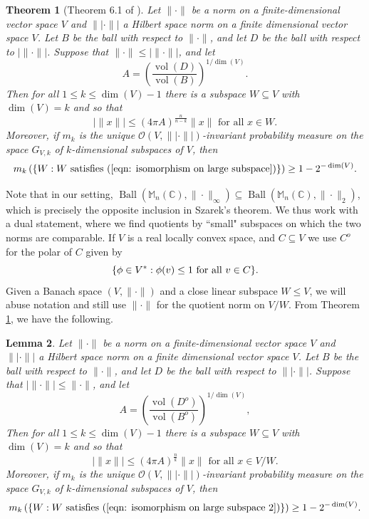 \documentclass[10pt]{amsart}
\newtheorem{thm}{Theorem}[section]
\newtheorem{lem}[thm]{Lemma}
\theoremstyle{definition}
\numberwithin{equation}{section}
\newcommand{\bC}{{\mathbb C}}
\newcommand{\bM}{{\mathbb M}}
\DeclareMathOperator{\vol}{vol}
\DeclareMathOperator{\Ball}{Ball}
\begin{document}
\begin{thm}[Theorem 6.1 of \cite{Pis}]\label{lemm: isomorphism on large subspace}
Let $\|\cdot\|$ be a norm on a finite-dimensional vector space $V$ and $\||\cdot\||$ a Hilbert space norm on a finite dimensional vector space $V$. Let $B$ be the  ball with respect to $\|\cdot\|$, and let $D$ be the ball with respect to $|\|\cdot\||$. Suppose that $ \|\cdot\|\leq |\|\cdot\||$, and let 
\[A=\left(\frac{\vol(D)}{\vol(B)}\right)^{1/\dim(V)}.\]
Then for all $1\leq k\leq \dim(V)-1$ there is a subspace $W\subseteq V$ with $\dim(V)=k$ and so that 
\begin{equation}\label{eqn: isomorphism on large subspace}
|\|x\||\leq \left(4\pi A\right)^{\frac{n}{n-k}}\|x\|\mbox{ for all $x\in W$.}
\end{equation}
Moreover, if $m_{k}$ is the unique $\mathcal{O}(V,\||\cdot\||)$-invariant probability measure on the space $G_{V,k}$ of $k$-dimensional subspaces of $V$, then
\[m_{k}\left(\{W:W \textnormal{ satisfies (\ref{eqn: isomorphism on large subspace})}\}\right)\geq 1-2^{-\dim(V)}.\]
\end{thm}


Note that in our setting, $\Ball(\bM_{n}(\bC),\|\cdot\|_{\infty})\subseteq \Ball(\bM_{n}(\bC),\|\cdot\|_{2})$, which is precisely the opposite inclusion in Szarek's theorem. We thus work with a dual statement, where we find quotients by ``small" subspaces on which the two norms are comparable. 
If $V$ is a real locally convex space, and $C\subseteq V$ we use $C^{o}$ for the polar of $C$ given by
\[\{\phi\in V^{*}:\phi(v)\leq 1\textnormal{ for all $v\in C$}\}.\]
Given a Banach space $(V,\|\cdot\|)$ and a close linear subspace $W\leq V$, we will abuse notation and still use $\|\cdot\|$ for the quotient norm on $V/W$. From Theorem \ref{lemm: isomorphism on large subspace}, we have the following. 

\begin{lem}\label{lemm:isomorphism on large quotient}
Let $\|\cdot\|$ be a norm on a finite-dimensional vector space $V$ and $\||\cdot\||$ a Hilbert space norm on a finite dimensional vector space $V$. Let $B$ be the  ball with respect to $\|\cdot\|$, and let $D$ be the ball with respect to $\||\cdot\||$. Suppose that $ |\|\cdot\||\leq \|\cdot\|$, and let 
\[A=\left(\frac{\vol(D^{o})}{\vol(B^{o})}\right)^{1/\dim(V)},\]
Then for all $1\leq k\leq \dim(V)-1$ there is a subspace $W\subseteq V$ with $\dim(V)=k$ and so that 
\begin{equation}\label{eqn: isomorphism on large subspace 2}
|\|x\||\leq \left(4\pi A\right)^{\frac{n}{k}}\|x\|\mbox{ for all $x\in V/W$.}
\end{equation}
Moreover, if $m_{k}$ is the unique $\mathcal{O}(V,\||\cdot\||)$-invariant probability measure on the space $G_{V,k}$ of $k$-dimensional subspaces of $V$, then
\[m_{k}\left(\{W:W \textnormal{ satisfies (\ref{eqn: isomorphism on large subspace 2})}\}\right)\geq 1-2^{-\dim(V)}.\]
\end{lem}
\end{document}
